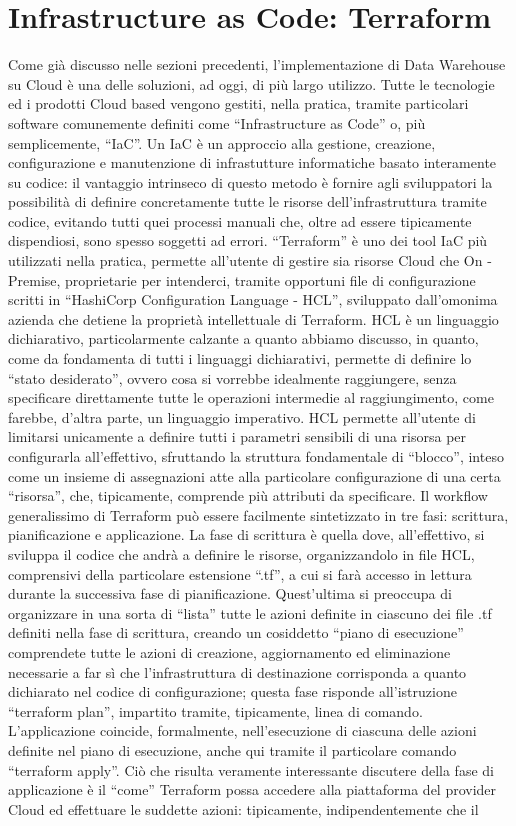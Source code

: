 \documentclass[a4paper,12pt]{report}
\begin{document}
\section{Infrastructure as Code: Terraform}
Come già discusso nelle sezioni precedenti, l’implementazione di Data Warehouse su Cloud è una delle soluzioni, ad oggi, di più largo utilizzo. Tutte le tecnologie ed i prodotti Cloud based vengono gestiti, nella pratica, tramite particolari software comunemente definiti come “Infrastructure as Code” o, più semplicemente, “IaC”. Un IaC è un approccio alla gestione, creazione, configurazione e manutenzione di infrastutture informatiche basato interamente su codice: il vantaggio intrinseco di questo metodo è fornire agli sviluppatori la possibilità di definire concretamente tutte le risorse dell’infrastruttura tramite codice, evitando tutti quei processi manuali che, oltre ad essere tipicamente dispendiosi, sono spesso soggetti ad errori. “Terraform” è uno dei tool IaC più utilizzati nella pratica, permette all’utente di gestire sia risorse Cloud che On - Premise, proprietarie per intenderci, tramite opportuni file di configurazione scritti in “HashiCorp Configuration Language - HCL”, sviluppato dall’omonima azienda che detiene la proprietà intellettuale di Terraform. HCL è un linguaggio dichiarativo, particolarmente calzante a quanto abbiamo discusso, in quanto, come da fondamenta di tutti i linguaggi dichiarativi, permette di definire lo “stato desiderato”, ovvero cosa si vorrebbe idealmente raggiungere, senza specificare direttamente tutte le operazioni intermedie al raggiungimento, come farebbe, d’altra parte, un linguaggio imperativo. HCL permette all’utente di limitarsi unicamente a definire tutti i parametri sensibili di una risorsa per configurarla all’effettivo, sfruttando la struttura fondamentale di “blocco”,  inteso come un insieme di assegnazioni atte alla particolare configurazione di una certa “risorsa”, che, tipicamente, comprende più attributi da specificare. Il workflow generalissimo di Terraform può essere facilmente sintetizzato in tre fasi: scrittura, pianificazione e applicazione. La fase di scrittura è quella dove, all’effettivo, si sviluppa il codice che andrà a definire le risorse, organizzandolo in file HCL, comprensivi della particolare estensione “.tf”, a cui si farà accesso in lettura durante la successiva fase di pianificazione. Quest’ultima si preoccupa di organizzare in una sorta di “lista” tutte le azioni definite in ciascuno dei file .tf definiti nella fase di scrittura, creando un cosiddetto “piano di esecuzione” comprendete tutte le azioni di creazione, aggiornamento ed eliminazione necessarie a far sì che l'infrastruttura di destinazione corrisponda a quanto dichiarato nel codice di configurazione; questa fase risponde all’istruzione “terraform plan”, impartito tramite, tipicamente, linea di comando. L’applicazione coincide, formalmente, nell’esecuzione di ciascuna delle azioni definite nel piano di esecuzione, anche qui tramite il particolare comando “terraform apply”. Ciò che risulta veramente interessante discutere della fase di applicazione è il “come” Terraform possa accedere alla piattaforma del provider Cloud ed effettuare le suddette azioni: tipicamente, indipendentemente che il 
\end{document}
